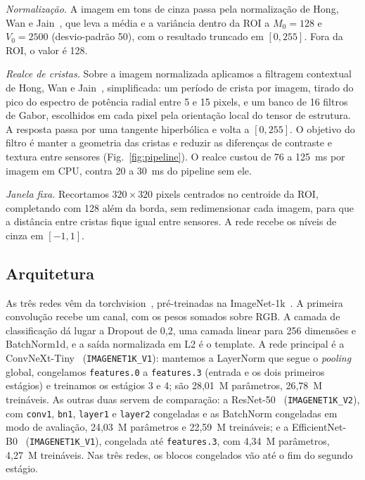 \documentclass[conference]{IEEEtran}
\begin{document}
\emph{Normalização.} A imagem em tons de cinza passa pela normalização de Hong, Wan e Jain~\cite{hong1998enhancement}, que leva a média e a variância dentro da ROI a $M_0=128$ e $V_0=2500$ (desvio-padrão 50), com o resultado truncado em $[0,255]$. Fora da ROI, o valor é 128.

\emph{Realce de cristas.} Sobre a imagem normalizada aplicamos a filtragem contextual de Hong, Wan e Jain~\cite{hong1998enhancement}, simplificada: um período de crista por imagem, tirado do pico do espectro de potência radial entre 5 e 15 pixels, e um banco de 16 filtros de Gabor, escolhidos em cada pixel pela orientação local do tensor de estrutura. A resposta passa por uma tangente hiperbólica e volta a $[0,255]$. O objetivo do filtro é manter a geometria das cristas e reduzir as diferenças de contraste e textura entre sensores (Fig.~\ref{fig:pipeline}). O realce custou de 76 a 125~ms por imagem em CPU, contra 20 a 30~ms do pipeline sem ele.

\emph{Janela fixa.} Recortamos $320\times320$ pixels centrados no centroide da ROI, completando com 128 além da borda, sem redimensionar cada imagem, para que a distância entre cristas fique igual entre sensores. A rede recebe os níveis de cinza em $[-1,1]$.

\subsection{Arquitetura}

As três redes vêm da torchvision~\cite{paszke2019pytorch}, pré-treinadas na ImageNet-1k~\cite{deng2009imagenet}. A primeira convolução recebe um canal, com os pesos somados sobre RGB. A camada de classificação dá lugar a Dropout de 0,2, uma camada linear para 256 dimensões e BatchNorm1d, e a saída normalizada em L2 é o template. A rede principal é a ConvNeXt-Tiny~\cite{liu2022convnext} (\texttt{IMAGENET1K\_V1}): mantemos a LayerNorm que segue o \emph{pooling} global, congelamos \texttt{features.0} a \texttt{features.3} (entrada e os dois primeiros estágios) e treinamos os estágios 3 e 4; são 28,01~M parâmetros, 26,78~M treináveis. As outras duas servem de comparação: a ResNet-50~\cite{he2016resnet} (\texttt{IMAGENET1K\_V2}), com \texttt{conv1}, \texttt{bn1}, \texttt{layer1} e \texttt{layer2} congeladas e as BatchNorm congeladas em modo de avaliação, 24,03~M parâmetros e 22,59~M treináveis; e a EfficientNet-B0~\cite{tan2019efficientnet} (\texttt{IMAGENET1K\_V1}), congelada até \texttt{features.3}, com 4,34~M parâmetros, 4,27~M treináveis. Nas três redes, os blocos congelados vão até o fim do segundo estágio.
\end{document}
